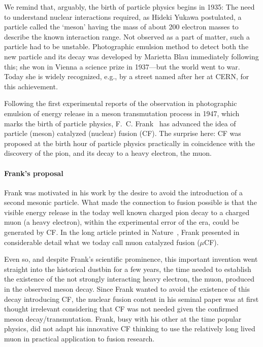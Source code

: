 \documentclass[particles,article,accept,pdftex,moreauthors]{Definitions/mdpi}
\begin{document}
We remind that, arguably, the birth of particle physics begins in 1935: The need to understand nuclear interactions required, as Hideki Yukawa postulated, a particle called the `meson' having the mass of about 200 electron masses to describe the known interaction range. Not observed as a part of matter, such a particle had to be unstable. Photographic emulsion method to detect both the new particle and its decay was developed by Marietta Blau immediately following this; she won in Vienna a science prize in 1937---but the world went to war. Today she is widely recognized, e.g., by a street named after her at CERN, for this achievement.

Following the first experimental reports of the observation in photographic emulsion of energy release in a meson transmutation process in 1947, which marks the birth of particle physics, F.~C. Frank~\cite{Frank:1947} has advanced the idea of particle (meson) catalyzed (nuclear) fusion (CF). The surprise here: CF was proposed at the birth hour of particle physics practically in coincidence with the discovery of the pion, and its decay to a heavy electron, the muon. 

\paragraph*{\bf Frank's proposal}
Frank was motivated in his work by the desire to avoid the introduction of a second mesonic particle. What made the connection to fusion possible is that the visible energy release in the today well known charged pion decay to a charged muon (a heavy electron), within the experimental error of the era, could be generated by CF. In the long article printed in Nature~\cite{Frank:1947}, Frank presented in considerable detail what we today call muon catalyzed fusion ($\mu$CF). 

Even so, and despite Frank's scientific prominence, this important invention went straight into the historical dustbin for a few years, the time needed to establish the existence of the not strongly interacting heavy electron, the muon, produced in the observed meson decay. Since Frank wanted to avoid the existence of this decay introducing CF, the nuclear fusion content in his seminal paper was at first thought irrelevant considering that CF was not needed given the confirmed meson decay/transmutation. Frank, busy with his other at the time popular physics, did not adapt his innovative CF thinking to use the relatively long lived muon in practical application to fusion research.
\end{document}
